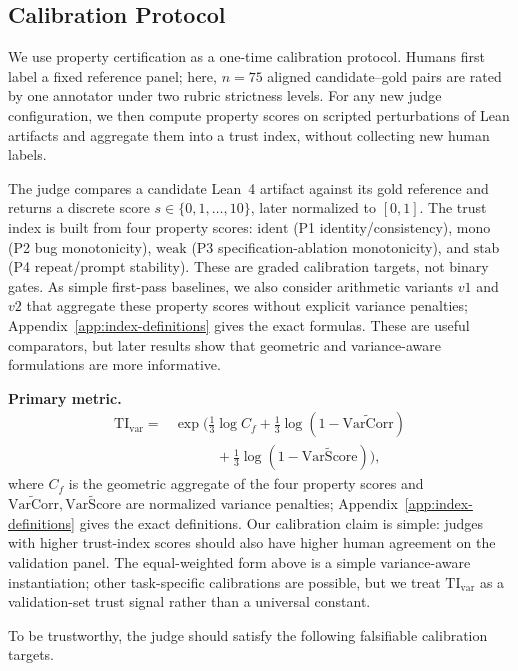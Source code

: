 \documentclass{article}
\begin{document}
\subsection{Calibration Protocol}
We use property certification as a one-time calibration protocol. Humans first label a fixed reference panel; here, \(n=75\) aligned candidate--gold pairs are rated by one annotator under two rubric strictness levels. For any new judge configuration, we then compute property scores on scripted perturbations of Lean artifacts and aggregate them into a trust index, without collecting new human labels.

The judge compares a candidate Lean~4 artifact against its gold reference and returns a discrete score \(s\in\{0,1,\dots,10\}\), later normalized to \([0,1]\). The trust index is built from four property scores:
\(\text{ident}\) (P1 identity/consistency),
\(\text{mono}\) (P2 bug monotonicity),
\(\text{weak}\) (P3 specification-ablation monotonicity), and
\(\text{stab}\) (P4 repeat/prompt stability).
These are graded calibration targets, not binary gates.
As simple first-pass baselines, we also consider arithmetic variants \(v1\) and \(v2\) that aggregate these property scores without explicit variance penalties; Appendix~\ref{app:index-definitions} gives the exact formulas. These are useful comparators, but later results show that geometric and variance-aware formulations are more informative.

\textbf{Primary metric.}
\[
  \begin{aligned}
    \mathrm{TI}_{\mathrm{var}}
    ={} & \exp\!\Big(
    \tfrac{1}{3}\log C_f
    + \tfrac{1}{3}\log(1-\widetilde{\mathrm{VarCorr}}) \\
        & \qquad\quad
    + \tfrac{1}{3}\log(1-\widetilde{\mathrm{VarScore}})
    \Big),
  \end{aligned}
\]
where \(C_f\) is the geometric aggregate of the four property scores and \(\widetilde{\mathrm{VarCorr}},\widetilde{\mathrm{VarScore}}\) are normalized variance penalties; Appendix~\ref{app:index-definitions} gives the exact definitions. Our calibration claim is simple: judges with higher trust-index scores should also have higher human agreement on the validation panel. The equal-weighted form above is a simple variance-aware instantiation; other task-specific calibrations are possible, but we treat \(\mathrm{TI}_{\mathrm{var}}\) as a validation-set trust signal rather than a universal constant.

To be trustworthy, the judge should satisfy the following falsifiable calibration targets.
\end{document}
